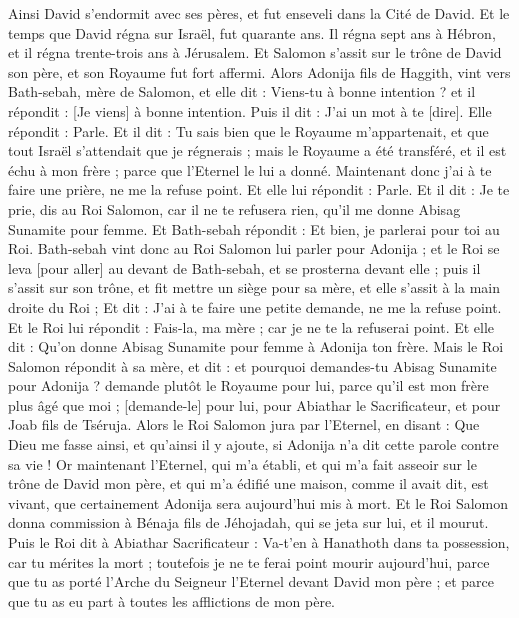\begin{multicols}{2}
Ainsi David s'endormit avec ses pères, et fut enseveli dans la Cité de David.
Et le temps que David régna sur Israël, fut quarante ans. Il régna sept ans à Hébron, et il régna trente-trois ans à Jérusalem.
Et Salomon s'assit sur le trône de David son père, et son Royaume fut fort affermi.
Alors Adonija fils de Haggith, vint vers Bath-sebah, mère de Salomon, et elle dit : Viens-tu à bonne intention ? et il répondit : [Je viens] à bonne intention.
Puis il dit : J'ai un mot à te [dire]. Elle répondit : Parle.
Et il dit : Tu sais bien que le Royaume m'appartenait, et que tout Israël s'attendait que je régnerais ; mais le Royaume a été transféré, et il est échu à mon frère ; parce que l'Eternel le lui a donné.
Maintenant donc j'ai à te faire une prière, ne me la refuse point. Et elle lui répondit : Parle.
Et il dit : Je te prie, dis au Roi Salomon, car il ne te refusera rien, qu'il me donne Abisag Sunamite pour femme.
Et Bath-sebah répondit : Et bien, je parlerai pour toi au Roi.
Bath-sebah vint donc au Roi Salomon lui parler pour Adonija ; et le Roi se leva [pour aller] au devant de Bath-sebah, et se prosterna devant elle ; puis il s'assit sur son trône, et fit mettre un siège pour sa mère, et elle s'assit à la main droite du Roi ;
Et dit : J'ai à te faire une petite demande, ne me la refuse point. Et le Roi lui répondit : Fais-la, ma mère ; car je ne te la refuserai point.
Et elle dit : Qu'on donne Abisag Sunamite pour femme à Adonija ton frère.
Mais le Roi Salomon répondit à sa mère, et dit : et pourquoi demandes-tu Abisag Sunamite pour Adonija ? demande plutôt le Royaume pour lui, parce qu'il est mon frère plus âgé que moi ; [demande-le] pour lui, pour Abiathar le Sacrificateur, et pour Joab fils de Tséruja.
Alors le Roi Salomon jura par l'Eternel, en disant : Que Dieu me fasse ainsi, et qu'ainsi il y ajoute, si Adonija n'a dit cette parole contre sa vie !
Or maintenant l'Eternel, qui m'a établi, et qui m'a fait asseoir sur le trône de David mon père, et qui m'a édifié une maison, comme il avait dit, est vivant, que certainement Adonija sera aujourd'hui mis à mort.
Et le Roi Salomon donna commission à Bénaja fils de Jéhojadah, qui se jeta sur lui, et il mourut.
Puis le Roi dit à Abiathar Sacrificateur : Va-t'en à Hanathoth dans ta possession, car tu mérites la mort ; toutefois je ne te ferai point mourir aujourd'hui, parce que tu as porté l'Arche du Seigneur l'Eternel devant David mon père ; et parce que tu as eu part à toutes les afflictions de mon père.

\end{multicols}
